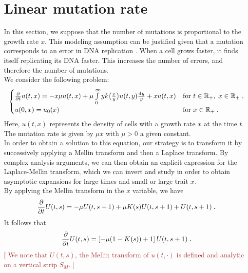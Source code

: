 \documentclass[11pt]{amsart}
\newcommand{\ndr}[1]{\textcolor{brown}{[#1]}}
\begin{document}
\section{Linear mutation rate}

In this section, we suppose that the number of mutations is proportional to the growth rate $x$. This modeling assumption can be justified given that a mutation corresponds to an error in DNA replication \cite{pray2008dna}. When a cell grows faster, it finds itself replicating its DNA faster. This increases the number of errors, and therefore the number of mutations.\\

We consider the following problem:
\begin{equation}
    \begin{cases}
	\frac{\partial}{\partial t}u(t,x) = - x\mu u(t,x) + \mu \int\limits_{0}^{\infty} y k\big( \frac{x}{y}\big) u(t,y) \frac{\mathrm dy}{y} + xu(t,x)
	& \text{for }t \in \mathbb{R}_+, \; x \in \mathbb{R}_+ \; ,
	\\
	u(0, x) = u_0(x)
	& \text{for }x \in \mathbb{R}_+
	\; .
    \end{cases}
    \label{eq:linearmutrate}
\end{equation}
Here, $u(t,x)$ represents the density of cells with a growth rate $x$ at the time $t$. The mutation rate is given by $\mu x$ with $\mu>0$ a given constant. \\

In order to obtain a solution to this equation, our strategy is to transform it by successively applying a Mellin transform and then a Laplace transform. By complex analysis arguments, we can then obtain an explicit expression for the Laplace-Mellin transform, which we can invert and study in order to obtain asymptotic expansions for large times and small or large trait $x$. \\

By applying the Mellin transform in the $x$ variable, we have
	\begin{equation*}
		\frac{\partial}{\partial t} U(t,s) = - \mu U(t,s+1) + \mu K(s) U(t,s+1) + U(t,s+1)
		\; .
	\end{equation*}
It follows that
    \begin{equation}
        \frac{\partial}{\partial t} U(t,s) = \left[- \mu (1-K(s)) + 1\right] U(t,s+1)
		\; .
        \label{eq:addgrowtheasy}
    \end{equation}
    \ndr{
We note that $U(t,s)$, the Mellin transform of $u(t,\cdot)$ is defined and analytic on a vertical strip $S_M$. }
\end{document}
